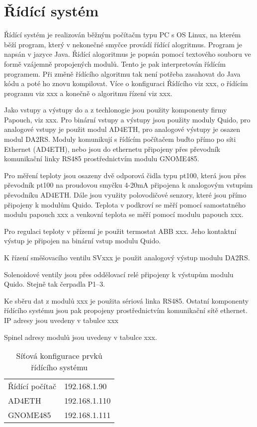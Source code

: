 \documentclass[a4paper,draft]{book}
\begin{document}
\chapter{Řídící systém}

    Řídící systém je realizován běžným počítačm typu PC s OS Linux, na kterém
    běží program, který v nekonečné smyčce provádí řídící alogritmus. Program
    je napsán v jazyce Java. Řídící alogoritmus je popsán pomocí textového
    souboru ve formě vzájemně propojených modulů. Tento je pak interpretován
    řídícím programem. Při změně řídícího algoritmu tak není potřeba zasahovat
    do Java kódu a poté ho znovu kompilovat. Více o konfiguraci Řídícího
    viz xxx, o řídícím programu viz xxx a konečně o algoritmu řízení viz xxx.

    Jako vstupy a výstupy do a z techlonogie jsou použity komponenty firmy
    Papouch, viz xxx. Pro binární vstupy a výstupy jsou použity moduly Quido,
    pro analogové vstupy je použit modul AD4ETH, pro analogové výstupy je
    osazen modul DA2RS. Moduly komunikují s řídícím počítačem buďto přímo
    po síti Ethernet (AD4ETH), nebo jsou do ethernetu připojeny přes převodník
    komunikační linky RS485 prostřednictvím modulu GNOME485.

    Pro měření teploty jsou osazeny dvě odporová čidla typu pt100, která jsou
    přes převodník pt100 na proudovou smyčku 4-20mA připojena k analogovým
    vstupům převodníku AD4ETH. Dále jsou využity polovodičové senzory, které
    jsou přímo připojeny k modulům Quido. Teplota v podkroví se měří pomocí
    samostatného modulu papouch xxx a venkovní teplota se měří pomocí modulu
    papouch xxx.

    Pro regulaci teploty v přízemí je použit termostat ABB xxx. Jeho kontaktní
    výstup je připojen na binární vstup modulu Quido.

    K řízení směšovacího ventilu SVxxx je použit analogový výstup modulu DA2RS.

    Solenoidové ventily jsou přes oddělovací relé připojeny k výstupům modulu
    Quido. Stejně tak čerpadla P1--3.

    Ke sběru dat z modulů xxx je použita sériová linka RS485. Ostatní komponenty
    řídícího systému jsou pak propojeny prostřednictvím komunikační sítě
    ethernet. IP adresy jsou uvedeny v tabulce xxx

    Spinel adresy modulů jsou uvedeny v tabulce xxx.

    \begin{table}
      \centering
      \begin{tabular}{ll}
        Řídící počítač & 192.168.1.90 \\
        AD4ETH         & 192.168.1.110\\
        GNOME485       & 192.168.1.111\\
      \end{tabular}
      \caption{Síťová konfigurace prvků řídícího systému}
    \end{table}
\end{document}
